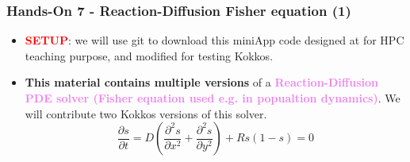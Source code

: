 \begin{frame}
  \frametitle{Hands-On 7 - Reaction-Diffusion Fisher equation (1)}

  \hypertarget{handson7}{}
  \begin{itemize}
  \item \textcolor{red}{\textbf{SETUP}}: we will use git to download this miniApp code designed at  for HPC teaching purpose, and modified for testing Kokkos.
  \end{itemize}

  \begin{itemize}
  \item \textbf{This material contains multiple versions} of a \textcolor{violet}{\textbf{Reaction-Diffusion PDE solver (Fisher equation used e.g. in popualtion dynamics)}}. We will contribute two Kokkos versions of this solver.
    $$ \frac{\partial s}{\partial t} = D \left( \frac{\partial^2 s}{\partial x^2} + \frac{\partial^2 s}{\partial y^2} \right) + R s (1-s) = 0$$
  \end{itemize}
  
\end{frame}

